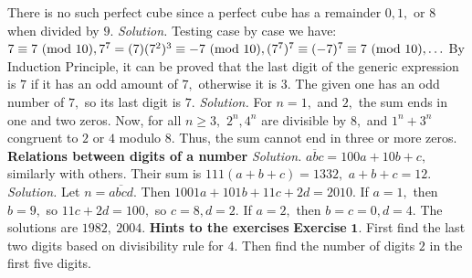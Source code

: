 \begin{multicols}{2}
	There is no such perfect cube since a perfect cube has a remainder $0, 1,$ or $8$ when divided by $9.$
	\vskip 0.1cm
	\vskip 0.1cm
	\textit{Solution.}
	Testing case by case we have:  $7 \equiv 7 \ (\mathrm{mod}\ 10), 7^7 = (7)(7^2)^3 \equiv -7 \ (\mathrm{mod}\ 10), (7^7)^7 \equiv (-7)^7 \equiv 7 \ (\mathrm{mod}\ 10), \ldots$
	By Induction Principle, it can be proved that the last digit of the generic expression is $7$ if it has an odd amount of $7,$
	otherwise it is $3.$ The given one has an odd number of $7,$ so its last digit is ${7.}$  
	\vskip 0.1cm
	\vskip 0.1cm
	\textit{Solution.}
	For $n=1,$ and $2,$ the sum ends in one and two zeros.
	Now, for all $n \ge 3,$ $2^n, 4^n$ are divisible by $8,$
	and $1^n + 3^n$ congruent to $2$ or $4$ modulo $8$.
	Thus, the sum cannot end in three or more zeros.
	\vskip 0.1cm
	\vskip 0.1cm
	\vskip 0.1cm
	\textbf{\color{toancuabi}Relations between digits of a number}
	\vskip 0.1cm
	\vskip 0.1cm
	\textit{Solution.}
	$\overline{abc} = 100a + 10b + c,$ similarly with others. Their sum is $111(a+b+c)=1332,$ $a+b+c=12.$
	\vskip 0.1cm
	\vskip 0.1cm
	\textit{Solution.}
	Let $n=\overline{abcd}.$ Then $1001a+101b+11c+2d=2010.$ If $a=1,$ then $b=9,$ so $11c+2d=100,$ so $c=8,d=2.$
	If $a=2,$ then $b=c=0,d=4.$ The solutions are ${1982,\ 2004}.$
	\vskip 0.1cm
	\vskip 0.1cm
	\textbf{\color{toancuabi}Hints to the exercises}
	\vskip 0.1cm
	\textbf{\color{toancuabi}Exercise} $\pmb{1.}$ First find the last two digits based on divisibility rule for $4.$
	Then find the number of digits $2$ in the first five digits.

\end{multicols}

